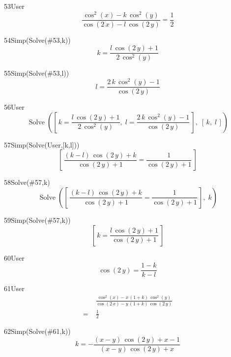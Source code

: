 \begin{espr}{53}{User}{}
\[
\frac{\cos^{2}\!\left(x\right) - k\, \cos^{2}\!\left(y\right)}{\cos\!\left(2\, x\right) - l\, \cos\!\left(2\, y\right)} = \frac{1}{2}
\]
\end{espr}
\begin{espr}{54}{Simp(Solve(\#53,k))}{}
\[
k = \frac{l\, \cos\!\left(2\, y\right) + 1}{2\, \cos^{2}\!\left(y\right)}
\]
\end{espr}
\begin{espr}{55}{Simp(Solve(\#53,l))}{}
\[
l = \frac{2\, k\, \cos^{2}\!\left(y\right) - 1}{\cos\!\left(2\, y\right)}
\]
\end{espr}
\begin{espr}{56}{User}{}
\[
\operatorname{Solve}\!\left(\left[\, k = \frac{l\, \cos\!\left(2\, y\right) + 1}{2\, \cos^{2}\!\left(y\right)},\; l = \frac{2\, k\, \cos^{2}\!\left(y\right) - 1}{\cos\!\left(2\, y\right)} \,\right],\; \left[\, k,\; l \,\right]\right)
\]
\end{espr}
\begin{espr}{57}{Simp(Solve(User,[k,l]))}{}
\[
\left[\, \frac{\left(k - l\right)\, \cos\!\left(2\, y\right) + k}{\cos\!\left(2\, y\right) + 1} = \frac{1}{\cos\!\left(2\, y\right) + 1} \,\right]
\]
\end{espr}
\begin{espr}{58}{Solve(\#57,k)}{}
\[
\operatorname{Solve}\!\left(\left[\, \frac{\left(k - l\right)\, \cos\!\left(2\, y\right) + k}{\cos\!\left(2\, y\right) + 1} = \frac{1}{\cos\!\left(2\, y\right) + 1} \,\right],\; k\right)
\]
\end{espr}
\begin{espr}{59}{Simp(Solve(\#57,k))}{}
\[
\left[\, k = \frac{l\, \cos\!\left(2\, y\right) + 1}{\cos\!\left(2\, y\right) + 1} \,\right]
\]
\end{espr}
\begin{espr}{60}{User}{}
\[
\cos\!\left(2\, y\right) = \frac{1 - k}{k - l}
\]
\end{espr}
\begin{espr}{61}{User}{}
\begin{align*}
& \frac{\cos^{2}\!\left(x\right) - x\, \left(1 + k\right)\, \cos^{2}\!\left(y\right)}{\cos\!\left(2\, x\right) - y\, \left(1 + k\right)\, \cos\!\left(2\, y\right)} \\
=\;& \frac{1}{2}
\end{align*}
\end{espr}
\begin{espr}{62}{Simp(Solve(\#61,k))}{}
\[
k = -\frac{\left(x - y\right)\, \cos\!\left(2\, y\right) + x - 1}{\left(x - y\right)\, \cos\!\left(2\, y\right) + x}
\]
\end{espr}
